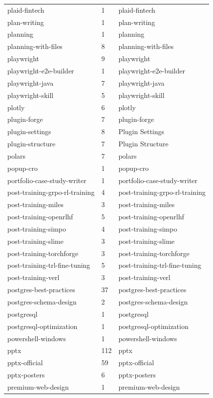 \begin{longtable}{@{}lll@{}}
plaid-fintech & 1 & plaid-fintech\\
plan-writing & 1 & plan-writing\\
planning & 1 & planning\\
planning-with-files & 8 & planning-with-files\\
playwright & 9 & playwright\\
playwright-e2e-builder & 1 & playwright-e2e-builder\\
playwright-java & 7 & playwright-java\\
playwright-skill & 5 & playwright-skill\\
plotly & 6 & plotly\\
plugin-forge & 7 & plugin-forge\\
plugin-settings & 8 & Plugin Settings\\
plugin-structure & 7 & Plugin Structure\\
polars & 7 & polars\\
popup-cro & 1 & popup-cro\\
portfolio-case-study-writer & 1 & portfolio-case-study-writer\\
post-training-grpo-rl-training & 4 & post-training-grpo-rl-training\\
post-training-miles & 3 & post-training-miles\\
post-training-openrlhf & 5 & post-training-openrlhf\\
post-training-simpo & 4 & post-training-simpo\\
post-training-slime & 3 & post-training-slime\\
post-training-torchforge & 3 & post-training-torchforge\\
post-training-trl-fine-tuning & 5 & post-training-trl-fine-tuning\\
post-training-verl & 3 & post-training-verl\\
postgres-best-practices & 37 & postgres-best-practices\\
postgres-schema-design & 2 & postgres-schema-design\\
postgresql & 1 & postgresql\\
postgresql-optimization & 1 & postgresql-optimization\\
powershell-windows & 1 & powershell-windows\\
pptx & 112 & pptx\\
pptx-official & 59 & pptx-official\\
pptx-posters & 6 & pptx-posters\\
premium-web-design & 1 & premium-web-design\\

\end{longtable}
